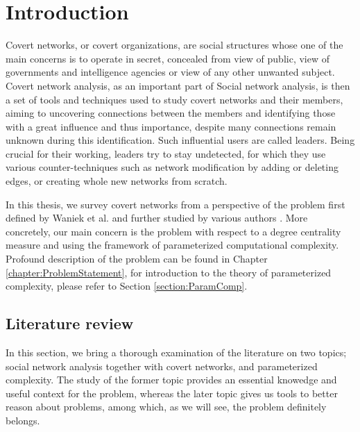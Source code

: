 \chapter*{Introduction}

\setcounter{page}{1}

Covert networks, or covert organizations, are social structures whose one of the main concerns is to operate in secret,
concealed from view of public, view of governments and intelligence agencies or view of any other unwanted subject.
Covert network analysis, as an important part of Social network analysis, is then a set of tools and techniques used to study
covert networks and their members, aiming to uncovering connections between the members and identifying those with a great
influence and thus importance, despite many connections remain unknown during this identification.
Such influential users are called leaders.
Being crucial for their working, leaders try to stay undetected, for which they use various counter-techniques such as
network modification by adding or deleting edges, or creating whole new networks from scratch.

In this thesis, we survey covert networks from a perspective of the \HL problem first defined by
Waniek et al. \cite{Waniek2017} and further studied by various authors \cite{Dey2019,Waniek2021,Mohan2023}.
More concretely, our main concern is the \HL problem with respect to a degree centrality measure
and using the framework of parameterized computational complexity.
Profound description of the \HL problem can be found in Chapter \ref{chapter:ProblemStatement}, for introduction to
the theory of parameterized complexity, please refer to Section \ref{section:ParamComp}.


\section{Literature review}

In this section, we bring a thorough examination of the literature on two topics;
social network analysis together with covert networks, and parameterized complexity.
The study of the former topic provides an essential knowedge and useful context for the \HL problem, whereas
the later topic gives us tools to better reason about \NPh problems, among which, as we will see, the \HL problem definitely belongs.

